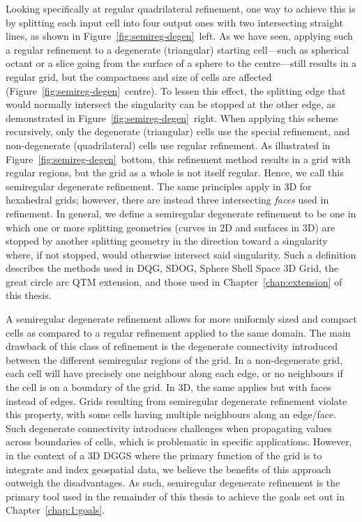 Looking specifically at regular quadrilateral refinement, one way to achieve this is by splitting each input cell into four output ones with two intersecting straight lines, as shown in Figure~\ref{fig:semireg-degen}~left.
As we have seen, applying such a regular refinement to a degenerate (triangular) starting cell---such as spherical octant or a slice going from the surface of a sphere to the centre---still results in a regular grid, but the compactness and size of cells are affected (Figure~\ref{fig:semireg-degen}~centre).
To lessen this effect, the splitting edge that would normally intersect the singularity can be stopped at the other edge, as demonstrated in Figure~\ref{fig:semireg-degen}~right.
When applying this scheme recursively, only the degenerate (triangular) cells use the special refinement, and non-degenerate (quadrilateral) cells use regular refinement.
As illustrated in Figure~\ref{fig:semireg-degen}~bottom, this refinement method results in a grid with regular regions, but the grid as a whole is not itself regular.
Hence, we call this semiregular degenerate refinement.
The same principles apply in 3D for hexahedral grids; however, there are instead three intersecting \textit{faces} used in refinement.
In general, we define a semiregular degenerate refinement to be one in which one or more splitting geometries (curves in 2D and surfaces in 3D) are stopped by another splitting geometry in the direction toward a singularity where, if not stopped, would otherwise intersect said singularity.
Such a definition describes the methods used in DQG, SDOG, Sphere Shell Space 3D Grid, the great circle arc QTM extension, and those used in Chapter~\ref{chap:extension} of this thesis.


A semiregular degenerate refinement allows for more uniformly sized and compact cells as compared to a regular refinement applied to the same domain.
The main drawback of this class of refinement is the degenerate connectivity introduced between the different semiregular regions of the grid.
In a non-degenerate grid, each cell will have precisely one neighbour along each edge, or no neighbours if the cell is on a boundary of the grid.
In 3D, the same applies but with faces instead of edges.
Grids resulting from semiregular degenerate refinement violate this property, with some cells having multiple neighbours along an edge/face.
Such degenerate connectivity introduces challenges when propagating values across boundaries of cells, which is problematic in specific applications.
However, in the context of a 3D DGGS where the primary function of the grid is to integrate and index geospatial data, we believe the benefits of this approach outweigh the disadvantages.
As such, semiregular degenerate refinement is the primary tool used in the remainder of this thesis to achieve the goals set out in Chapter~\ref{chap:1:goals}.
